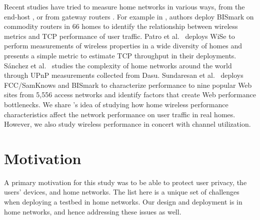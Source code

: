 Recent studies have tried to measure home networks in various ways, from the end-host \cite{chetty2011my,dicioccio2012probe,sanchez2013trying}, or from gateway routers \cite{grover2013peeking,sundaresan2015measuring,patro2013observing,sundaresan2013measuring,pefkianakis2015characterizing}. For example in \cite{sundaresan2015measuring}, authors deploy BISmark on commodity routers in 66 homes to identify the relationship between wireless metrics and TCP performance of user traffic. Patro et al.~\cite{patro2013observing} deploys WiSe to perform measurements of wireless properties in a wide diversity of homes and presents a simple metric to estimate TCP throughput in their deployments. S{\'a}nchez et al.~\cite{sanchez2013trying} studies the complexity of home networks around the world through UPnP measurements collected from Dasu. Sundaresan et al.~\cite{sundaresan2013measuring} deploys FCC/SamKnows and BISmark to characterize performance to nine popular Web sites from 5,556 access networks and identify factors that create Web performance bottlenecks. We share \cite{sundaresan2015measuring}'s idea of studying how home wireless performance characteristics affect the network performance on user traffic in real homes. However, we also study wireless performance in concert with channel utilization.

\section{Motivation}
\label{sec.motivation}
A primary motivation for this study was to be able to protect user privacy, the users' devices, and home networks. The list here is a unique set of challenges when deploying a testbed in home networks. Our design and deployment is in home networks, and hence addressing these issues as well.

